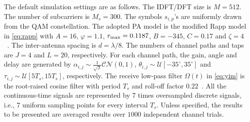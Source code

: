 \documentclass[10pt,twocolumn,twoside]{IEEEtran}
\begin{document}
The default simulation settings are as follows.
The IDFT/DFT size is $M=512$.
The number of subcarriers is $M_s=300$.
The symbols $s_{i,p}$'s are uniformly drawn from the QAM constellation.
The adopted PA model is the modified Rapp model in \eqref{eq:rapp} with $A=16$, $\varphi=1.1$, $r_{\rm max}=0.1187$, $B=-345$, $C=0.17$ and $\zeta =4$~\cite{3gpp_pa}.
The inter-antenna spacing is $d = \lambda / 8$.
The numbers of channel paths and taps are $J = 4$ and $L = 20$, respectively.
For each channel path, the gain, angle and delay are generated by $\alpha_{i,j} \sim \frac{1}{\sqrt{J}} \mathcal{CN}(0,1)$,  $\theta_{i,j} \sim \mathcal{U}{[-35^\circ,35^\circ]}$ and $\tau_{i,j} \sim \mathcal{U}{[5T_s,15T_s]}$, respectively.
The receive low-pass filter $\Omega(t)$ in \eqref{eq:yim} is the root-raised cosine filter with period $T_s$ and roll-off factor $0.22$~\cite{mollen2016waveforms}.
All the continuous-time signals are represented by 7 times oversampled discrete signals, i.e., $7$ uniform sampling points for every interval $T_s$.
Unless specified, the results to be presented are averaged results over $1000$ independent channel trials.
\end{document}
